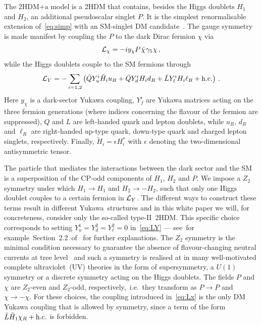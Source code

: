 \documentclass[a4paper, 11pt,notoc]{article}
\newcommand{\hdma}{\ensuremath{\textrm{2HDM+a}}\xspace}
\begin{document}
The \hdma model is a 2HDM that contains, besides the Higgs doublets $H_1$ and $H_2$, an additional pseudoscalar singlet $P$. It is the simplest renormalisable extension of~\eqref{eq:simp} with an SM-singlet DM candidate~\cite{Ipek:2014gua,No:2015xqa,Goncalves:2016iyg,Bauer:2017ota,Tunney:2017yfp}. The gauge symmetry is made manifest by coupling the $P$ to the dark Dirac fermion  $\chi$ via
\begin{equation} \label{eq:Lx}
{\cal L}_\chi = - i y_\chi P \hspace{0.25mm} \bar \chi \hspace{0.25mm} \gamma_5 \hspace{0.1mm} \chi \,,
\end{equation}
while the Higgs doublets couple to the SM fermions through
\begin{equation} \label{eq:LY}
{\cal L}_{Y} = - \sum_{i=1,2} \left ( \bar Q Y_u^i \tilde H_i u_R  + \bar Q Y_d^i H_i d_R   + \bar L Y_\ell^i H_i \ell_R  + {\rm h.c.}  \right ) \,.
\end{equation}
Here $y_\chi$ is a dark-sector Yukawa coupling, $Y_f^i$ are Yukawa matrices acting on the three fermion generations (where indices concerning the flavour of the fermion are suppressed), $Q$ and $L$ are left-handed quark and lepton doublets, while $u_R$, $d_R$ and $\ell_R$ are right-handed up-type quark, down-type quark and charged lepton singlets, respectively. Finally, $\tilde H_i = \epsilon H_i^\ast$ with $\epsilon$ denoting the  two-dimensional antisymmetric tensor.

The particle that mediates the interactions between the dark sector and the SM is a superposition of the CP-odd components of $H_1$, $H_2$ and $P$. We impose a $Z_2$ symmetry under which $H_1\to H_1$ and $H_2\to -H_2$, such that only one Higgs doublet couples to a certain fermion in ${\cal L}_{Y}$. The different ways to construct these terms result in different Yukawa~structures and in this white paper we will, for concreteness, consider only the so-called type-II~2HDM. This specific choice corresponds to setting $Y_u^1  = Y_d^2 = Y_\ell^2 =0$ in~\eqref{eq:LY} --- see~for example~Section~2.2~of~\cite{Bauer:2017ota} for further explanations.  The $Z_2$ symmetry is the minimal condition necessary to guarantee the absence of flavour-changing neutral currents at tree level~\cite{Glashow:1976nt,Paschos:1976ay} and such a symmetry is realised at in many well-motivated complete ultraviolet~(UV) theories in the form of supersymmetry, a $U(1)$ symmetry or  a discrete symmetry acting on the Higgs doublets. The fields $P$ and $\chi$ are $Z_2$-even and $Z_2$-odd, respectively,~i.e.~they transform as $P \to P$ and $\chi \to -\chi$. For these choices, the coupling introduced in~\eqref{eq:Lx} is the only DM Yukawa coupling that is allowed by symmetry, since  a term of the form $\bar L  \tilde H_1 \chi_R + {\rm h.c.}$ is forbidden. 
\end{document}

